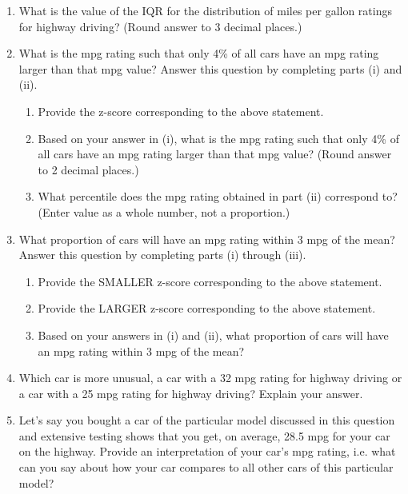 \begin{enumerate}
\item What is the value of the IQR for the distribution of miles per gallon ratings for highway driving?  (Round answer to 3 decimal places.)

\item What is the mpg rating such that only 4\% of all cars have an mpg rating larger than that mpg value?  Answer this question by completing parts (i) and (ii).  
\begin{enumerate}
\item Provide the z-score corresponding to the above statement. 
\item Based on your answer in (i), what is the mpg rating such that only 4\% of all cars have an mpg rating larger than that mpg value?  (Round answer to 2 decimal places.)
\item  What percentile does the mpg rating obtained in part (ii) correspond to?  (Enter value as a whole number, not a proportion.)
\end{enumerate}

\item What proportion of cars will have an mpg rating within 3 mpg of the mean?  Answer this question by completing parts (i) through (iii).  
\begin{enumerate}
\item  Provide the SMALLER z-score corresponding to the above statement.
\item  Provide the LARGER z-score corresponding to the above statement.
\item  Based on your answers in (i) and (ii), what proportion of cars will have an mpg rating within 3 mpg of the mean?
\end{enumerate}


\item  Which car is more unusual, a car with a 32 mpg rating for highway driving or a car with a 25 mpg rating for highway driving? Explain your answer. 

\item  Let's say you bought a car of the particular model discussed in this question and extensive testing shows that you get, on average, 28.5 mpg for your car on the highway. Provide an interpretation of your car's mpg rating, i.e. what can you say about how your car compares to all other cars of this particular model?   



\end{enumerate} 